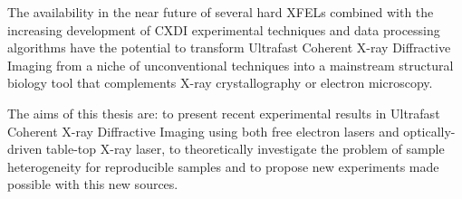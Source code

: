 The availability in the near future of several hard XFELs combined with the
increasing development of CXDI experimental techniques and data processing
algorithms have the potential to transform Ultrafast Coherent X-ray Diffractive
Imaging from a niche of unconventional techniques into a mainstream structural
biology tool that complements X-ray crystallography or electron microscopy.


The aims of this thesis are: to present recent experimental results in Ultrafast
Coherent X-ray Diffractive Imaging using both free electron lasers and
optically-driven table-top X-ray laser, to theoretically investigate the problem of sample heterogeneity
for reproducible samples and to propose new experiments made possible with this
new sources.
